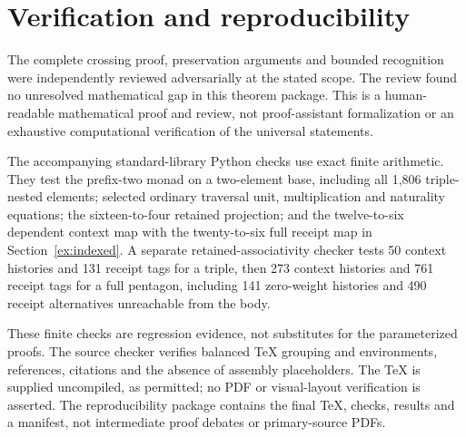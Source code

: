 \documentclass[11pt,a4paper]{article}
\theoremstyle{definition}
\begin{document}
\section{Verification and reproducibility}\label{sec:verification}

The complete crossing proof, preservation arguments and bounded recognition
were independently reviewed adversarially at the stated scope. The review
found no unresolved mathematical gap in this theorem package. This is a
human-readable mathematical proof and review, not proof-assistant
formalization or an exhaustive computational verification of the universal
statements.

The accompanying standard-library Python checks use exact finite arithmetic.
They test the prefix-two monad on a two-element base, including all 1,806
triple-nested elements; selected ordinary traversal unit, multiplication and
naturality equations; the sixteen-to-four retained projection; and the
twelve-to-six dependent context map with the twenty-to-six full receipt map
in Section~\ref{ex:indexed}. A separate retained-associativity checker tests
50 context histories and 131 receipt tags for a triple, then 273 context
histories and 761 receipt tags for a full pentagon, including 141 zero-weight
histories and 490 receipt alternatives unreachable from the body.

These finite checks are regression evidence, not substitutes for the
parameterized proofs. The source checker verifies balanced TeX grouping and
environments, references, citations and the absence of assembly placeholders.
The TeX is supplied uncompiled, as permitted; no PDF or visual-layout verification
is asserted. The reproducibility package contains the final TeX, checks,
results and a manifest, not intermediate proof debates or primary-source PDFs.
\end{document}
